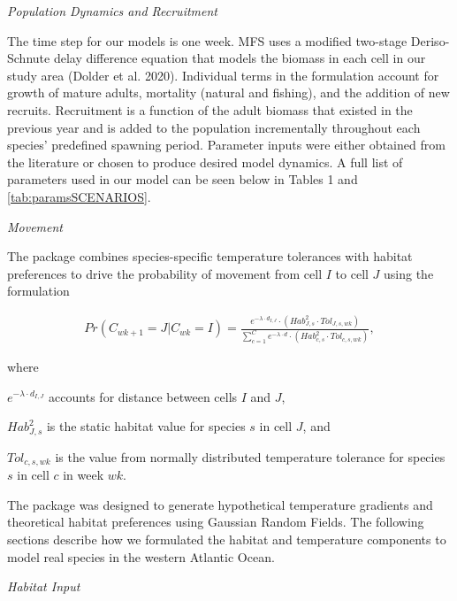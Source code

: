 \documentclass[
  12pt,
]{article}
\begin{document}
\emph{Population Dynamics and Recruitment}

The time step for our models is one week. MFS uses a modified two-stage Deriso-Schnute delay difference equation that models the biomass in each cell in our study area (Dolder et al. 2020). Individual terms in the formulation account for growth of mature adults, mortality (natural and fishing), and the addition of new recruits. Recruitment is a function of the adult biomass that existed in the previous year and is added to the population incrementally throughout each species' predefined spawning period. Parameter inputs were either obtained from the literature or chosen to produce desired model dynamics. A full list of parameters used in our model can be seen below in Tables 1 and \ref{tab:paramsSCENARIOS}.

\emph{Movement}

The package combines species-specific temperature tolerances with habitat preferences to drive the probability of movement from cell \(I\) to cell \(J\) using the formulation

\begin{align}
Pr(C_{wk+1}=J|C_{wk}=I) = \frac{e^{-\lambda \cdot d_{I,J}}\cdot(Hab^2_{J,s} \cdot Tol_{J,s,wk})}{\sum^C_{c=1}e^{-\lambda \cdot d} \cdot (Hab^2_{c,s} \cdot Tol_{c,s,wk})},
\label{moveP}
\end{align}

where

\(e^{-\lambda \cdot d_{I,J}}\) accounts for distance between cells \(I\) and \(J\),

\(Hab^2_{J,s}\) is the static habitat value for species \(s\) in cell \(J\), and

\(Tol_{c,s,wk}\) is the value from normally distributed temperature tolerance for species \(s\) in cell \(c\) in week \(wk\).

The package was designed to generate hypothetical temperature gradients and theoretical habitat preferences using Gaussian Random Fields. The following sections describe how we formulated the habitat and temperature components to model real species in the western Atlantic Ocean.

\emph{Habitat Input}
\end{document}
